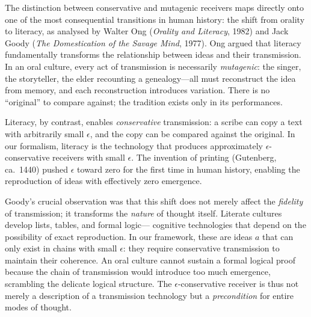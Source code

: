 \begin{interpretation}
\label{interp:ch9:ong_goody_literacy}
The distinction between conservative and mutagenic receivers maps directly
onto one of the most consequential transitions in human history: the shift
from orality to literacy, as analysed by Walter Ong (\emph{Orality and
Literacy}, 1982) and Jack Goody (\emph{The Domestication of the Savage
Mind}, 1977).  Ong argued that literacy fundamentally transforms the
relationship between ideas and their transmission.  In an oral culture,
every act of transmission is necessarily \emph{mutagenic}: the singer, the
storyteller, the elder recounting a genealogy---all must reconstruct the idea
from memory, and each reconstruction introduces variation.  There is no
``original'' to compare against; the tradition exists only in its
performances.

Literacy, by contrast, enables \emph{conservative} transmission: a scribe
can copy a text with arbitrarily small $\epsilon$, and the copy can be
compared against the original.  In our formalism, literacy is the technology
that produces approximately $\epsilon$-conservative receivers with small
$\epsilon$.  The invention of printing (Gutenberg, ca.\ 1440) pushed
$\epsilon$ toward zero for the first time in human history, enabling the
reproduction of ideas with effectively zero emergence.

Goody's crucial observation was that this shift does not merely affect the
\emph{fidelity} of transmission; it transforms the \emph{nature} of thought
itself.  Literate cultures develop lists, tables, and formal logic---
cognitive technologies that depend on the possibility of exact reproduction.
In our framework, these are ideas $a$ that can only exist in chains with
small $\epsilon$: they require conservative transmission to maintain their
coherence.  An oral culture cannot sustain a formal logical proof because the
chain of transmission would introduce too much emergence, scrambling the
delicate logical structure.  The $\epsilon$-conservative receiver is thus
not merely a description of a transmission technology but a \emph{precondition}
for entire modes of thought.
\end{interpretation}

